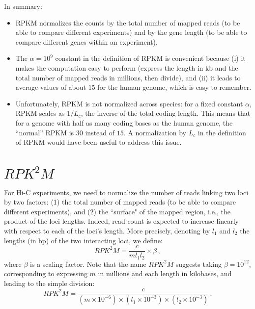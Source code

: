 \documentclass{article}
\begin{document}
In summary:
\begin{itemize}
\item RPKM normalizes the counts by the total number of mapped reads
  (to be able to compare different experiments) and by the gene length
  (to be able to compare different genes within an experiment).
\item The $\alpha=10^9$ constant in the definition of RPKM is
  convenient because (i) it makes the computation easy to perform
  (express the length in kb and the total number of mapped reads in
  millions, then divide), and (ii) it leads to average values of about
  $15$ for the human genome, which is easy to remember.
\item Unfortunately, RPKM is not normalized across species: for a
  fixed constant $\alpha$, RPKM scales as $1/L_c$, the inverse of the
  total coding length. This means that for a genome with half as many
  coding bases as the human genome, the ``normal'' RPKM is $30$
  instead of $15$. A normalization by $L_c$ in the definition of RPKM
  would have been useful to address this issue.
\end{itemize}

\section{$RPK^2M$}

For Hi-C experiments, we need to normalize the number of reads linking
two loci by two factors: (1) the total number of mapped reads (to be
able to compare different experiments), and (2) the ``surface" of the
mapped region, i.e., the product of the loci lengths. Indeed, read
count is expected to increase linearly with respect to each of the
loci's length. More precisely, denoting by $l_1$ and $l_2$ the lengths
(in bp) of the two interacting loci, we define:
\[
RPK^2M = \frac{c}{ml_1l_2}\times \beta\,,
\]
where $\beta$ is a scaling factor.
Note that the name $RPK^2M$ suggests taking $\beta=10^{12}$, corresponding to expressing $m$ in millions and each length in kilobases, and leading to the simple division:
\[
RPK^2M = \frac{c}{(m \times 10^{-6})\times (l_1 \times 10^{-3}) \times (l_2 \times 10^{-3})}\,.
\]
\end{document}
